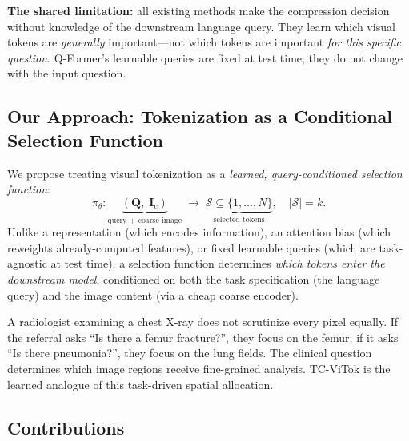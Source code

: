 \documentclass[11pt,a4paper]{article}
\newcommand{\mI}{\mathbf{I}}
\newcommand{\mQ}{\mathbf{Q}}
\begin{document}
\textbf{The shared limitation:} all existing methods make the compression
decision without knowledge of the downstream language query. They learn which
visual tokens are \emph{generally} important---not which tokens are important
\emph{for this specific question}. Q-Former's learnable queries are fixed at
test time; they do not change with the input question.

\subsection{Our Approach: Tokenization as a Conditional Selection Function}

We propose treating visual tokenization as a \emph{learned, query-conditioned
selection function}:
\begin{equation}
  \pi_\theta\colon
  \underbrace{(\mQ,\;\mI_{\mathrm{c}})}_{\text{query + coarse image}}
  \;\longrightarrow\;
  \underbrace{\mathcal{S} \subseteq \{1,\ldots,N\}}_{\text{selected tokens}},
  \quad |\mathcal{S}| = k.
  \label{eq:policy_def}
\end{equation}
Unlike a representation (which encodes information), an attention bias (which
reweights already-computed features), or fixed learnable queries (which are
task-agnostic at test time), a selection function determines \emph{which tokens
enter the downstream model}, conditioned on both the task specification (the
language query) and the image content (via a cheap coarse encoder).

\begin{intuitionbox}
  A radiologist examining a chest X-ray does not scrutinize every pixel equally.
  If the referral asks ``Is there a femur fracture?'', they focus on the femur;
  if it asks ``Is there pneumonia?'', they focus on the lung fields. The clinical
  question determines which image regions receive fine-grained analysis. TC-ViTok
  is the learned analogue of this task-driven spatial allocation.
\end{intuitionbox}

\subsection{Contributions}
\end{document}
